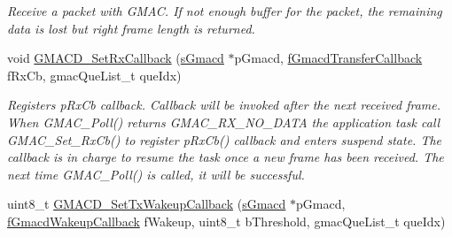 \begin{DoxyCompactItemize}
\begin{DoxyCompactList}\small\item\em Receive a packet with G\+M\+AC. If not enough buffer for the packet, the remaining data is lost but right frame length is returned. \end{DoxyCompactList}\item 
void \mbox{\hyperlink{group__gmacd__defines_ga3ea0884def476f9698f1cdbae6b6f3e2}{G\+M\+A\+C\+D\+\_\+\+Set\+Rx\+Callback}} (\mbox{\hyperlink{group__gmacd__types_gaa8760917079000a5ee7fbc7fab992dd3}{s\+Gmacd}} $\ast$p\+Gmacd, \mbox{\hyperlink{group__gmacd__types_ga64979042bf43f697de166e864e3259de}{f\+Gmacd\+Transfer\+Callback}} f\+Rx\+Cb, gmac\+Que\+List\+\_\+t que\+Idx)
\begin{DoxyCompactList}\small\item\em Registers p\+Rx\+Cb callback. Callback will be invoked after the next received frame. When G\+M\+A\+C\+\_\+\+Poll() returns G\+M\+A\+C\+\_\+\+R\+X\+\_\+\+N\+O\+\_\+\+D\+A\+TA the application task call G\+M\+A\+C\+\_\+\+Set\+\_\+\+Rx\+Cb() to register p\+Rx\+Cb() callback and enters suspend state. The callback is in charge to resume the task once a new frame has been received. The next time G\+M\+A\+C\+\_\+\+Poll() is called, it will be successful. \end{DoxyCompactList}\item 
uint8\+\_\+t \mbox{\hyperlink{group__gmacd__defines_ga0806a8a23ffb3180d3404ec6d7fbfa1d}{G\+M\+A\+C\+D\+\_\+\+Set\+Tx\+Wakeup\+Callback}} (\mbox{\hyperlink{group__gmacd__types_gaa8760917079000a5ee7fbc7fab992dd3}{s\+Gmacd}} $\ast$p\+Gmacd, \mbox{\hyperlink{group__gmacd__types_ga44e6be4bb53db0660baf6cb50b20a684}{f\+Gmacd\+Wakeup\+Callback}} f\+Wakeup, uint8\+\_\+t b\+Threshold, gmac\+Que\+List\+\_\+t que\+Idx)
\end{DoxyCompactItemize}
